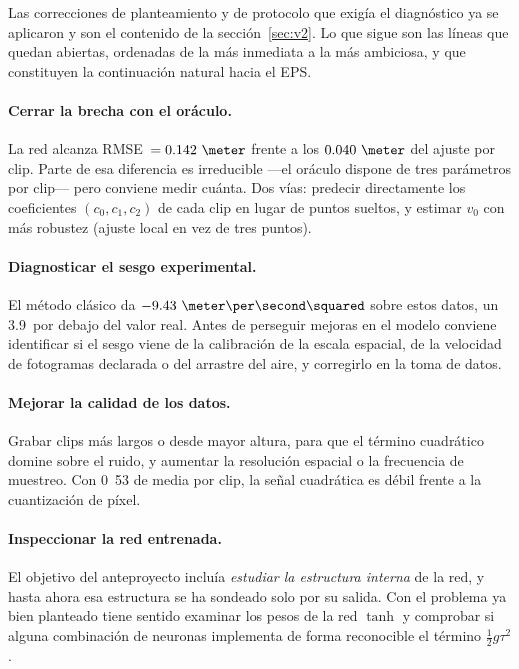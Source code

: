 \documentclass[titlepage,11pt]{article}
\providecommand{\num}[1]{\ensuremath{#1}}
\providecommand{\SI}[2]{#1\,#2}
\providecommand{\percent}{\char37\relax}
\begin{document}
Las correcciones de planteamiento y de protocolo que exigía el diagnóstico ya
se aplicaron y son el contenido de la sección~\ref{sec:v2}. Lo que sigue son
las líneas que quedan abiertas, ordenadas de la más inmediata a la más
ambiciosa, y que constituyen la continuación natural hacia el EPS.

\paragraph{Cerrar la brecha con el oráculo.} La red alcanza
RMSE~$=\num{0.142}~\meter$ frente a los $\num{0.040}~\meter$ del ajuste por
clip. Parte de esa diferencia es irreducible ---el oráculo dispone de tres
parámetros por clip--- pero conviene medir cuánta. Dos vías: predecir
directamente los coeficientes $(c_0,c_1,c_2)$ de cada clip en lugar de puntos
sueltos, y estimar $v_0$ con más robustez (ajuste local en vez de tres puntos).

\paragraph{Diagnosticar el sesgo experimental.} El método clásico da
$\num{-9.43}~\meter\per\second\squared$ sobre estos datos, un
\SI{3.9}{\percent} por debajo del valor real. Antes de perseguir mejoras en el
modelo conviene identificar si el sesgo viene de la calibración de la escala
espacial, de la velocidad de fotogramas declarada o del arrastre del aire, y
corregirlo en la toma de datos.

\paragraph{Mejorar la calidad de los datos.} Grabar clips más largos o desde
mayor altura, para que el término cuadrático domine sobre el ruido, y aumentar
la resolución espacial o la frecuencia de muestreo. Con
\unit{0.53}{\second} de media por clip, la señal cuadrática es débil frente a
la cuantización de píxel.

\paragraph{Inspeccionar la red entrenada.} El objetivo del anteproyecto incluía
\emph{estudiar la estructura interna} de la red, y hasta ahora esa estructura
se ha sondeado solo por su salida. Con el problema ya bien planteado tiene
sentido examinar los pesos de la red $\tanh$ y comprobar si alguna combinación
de neuronas implementa de forma reconocible el término $\tfrac{1}{2}g\tau^2$.
\end{document}
